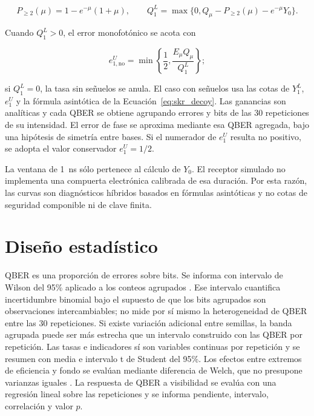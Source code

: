 \begin{equation}
  P_{\geq2}(\mu)=1-e^{-\mu}(1+\mu),\qquad
  Q_1^{L}=\max\{0,Q_\mu-P_{\geq2}(\mu)-e^{-\mu}Y_0\}.
  \label{eq:no_decoy_q1}
\end{equation}

Cuando \(Q_1^L>0\), el error monofotónico se acota con

\begin{equation}
  e_{1,\mathrm{no}}^{U}
  =\min\left\{\frac{1}{2},\frac{E_\mu Q_\mu}{Q_1^L}\right\};
  \label{eq:no_decoy_e1}
\end{equation}

si \(Q_1^L=0\), la tasa sin señuelos se anula. El caso con señuelos usa las cotas de \(Y_1^L\), \(e_1^U\) y la fórmula asintótica de la Ecuación~\ref{eq:skr_decoy}. Las ganancias son analíticas y cada QBER se obtiene agrupando errores y bits de las 30 repeticiones de su intensidad. El error de fase se aproxima mediante esa QBER agregada, bajo una hipótesis de simetría entre bases. Si el numerador de \(e_1^U\) resulta no positivo, se adopta el valor conservador \(e_1^U=1/2\).

La ventana de \SI{1}{\nano\second} sólo pertenece al cálculo de \(Y_0\). El receptor simulado no implementa una compuerta electrónica calibrada de esa duración. Por esta razón, las curvas son diagnósticos híbridos basados en fórmulas asintóticas y no cotas de seguridad componible ni de clave finita.

\section{Diseño estadístico}

QBER es una proporción de errores sobre bits. Se informa con intervalo de Wilson del 95\% aplicado a los conteos agrupados \cite{wilson1927}. Ese intervalo cuantifica incertidumbre binomial bajo el supuesto de que los bits agrupados son observaciones intercambiables; no mide por sí mismo la heterogeneidad de QBER entre las 30 repeticiones. Si existe variación adicional entre semillas, la banda agrupada puede ser más estrecha que un intervalo construido con las QBER por repetición. Las tasas e indicadores sí son variables continuas por repetición y se resumen con media e intervalo t de Student del 95\%. Los efectos entre extremos de eficiencia y fondo se evalúan mediante diferencia de Welch, que no presupone varianzas iguales \cite{welch1947}. La respuesta de QBER a visibilidad se evalúa con una regresión lineal sobre las repeticiones y se informa pendiente, intervalo, correlación y valor \(p\).

